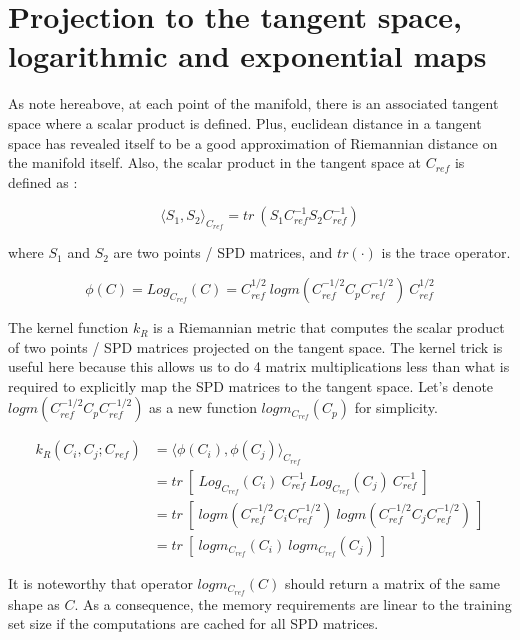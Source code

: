 \documentclass[a4paper,11pt]{report}
\begin{document}
\section{Projection to the tangent space, logarithmic and exponential maps}

As note hereabove, at each point of the manifold, there is an associated tangent space where a scalar product is defined.
Plus, euclidean distance in a tangent space has revealed itself to be a good approximation of Riemannian distance
on the manifold itself. Also, the scalar product in the tangent space at $C_{ref}$ is defined as \citep{BARACHANT2013172}:

\begin{equation}
    \langle S_1, S_2 \rangle_{C_{ref}} = tr \ (S_1 C_{ref}^{-1} S_2 C_{ref}^{-1})
\end{equation}

where $S_1$ and $S_2$ are two points / SPD matrices, and $tr(\cdot)$ is the trace operator.

\begin{equation}
    \phi(C) = Log_{C_{ref}} (C) = C_{ref}^{1/2} \ logm(C_{ref}^{-1/2} C_p C_{ref}^{-1/2}) \ C_{ref}^{1/2}
\end{equation}

The kernel function $k_R$ is a Riemannian metric that computes the scalar product of two points / SPD matrices projected
on the tangent space. The kernel trick is useful here because this allows us to do 4 matrix multiplications less than
what is required to explicitly map the SPD matrices to the tangent space.
Let's denote $logm(C_{ref}^{-1/2} C_p C_{ref}^{-1/2})$ as a new function $logm_{C_{ref}} (C_p)$ for simplicity.

\begin{align}
    k_R(C_i, C_j; C_{ref}) & = \langle \phi(C_i), \phi(C_j) \rangle_{C_{ref}} \\
    & = tr \ [\ Log_{C_{ref}} (C_i) \ C_{ref}^{-1} \ Log_{C_{ref}} (C_j) \ C_{ref}^{-1} \ ] \\
    & = tr \ [\ logm(C_{ref}^{-1/2} C_i C_{ref}^{-1/2}) \ logm(C_{ref}^{-1/2} C_j C_{ref}^{-1/2}) \ ] \\
    & = tr \ [\ logm_{C_{ref}} (C_i) \ logm_{C_{ref}} (C_j) \ ] 
\end{align}

It is noteworthy that operator $logm_{C_{ref}} (C)$ should return a matrix of the same shape as $C$.
As a consequence, the memory requirements are linear to the training set size if the computations
are cached for all SPD matrices.
\end{document}
